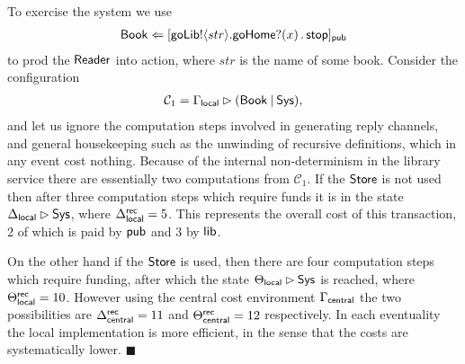\documentclass{LMCS}
\newcommand{\pfn}[1]{\mathsf{#1}}  \newcommand{\cfn}[1]{\mathsf{#1}}  \newcommand{\ownfnt}[1]{{\mathsf{#1}}}
\newcommand{\with}{\mathbin \rhd}
\newcommand{\record}{{\scriptstyle \mathsf{rec}}}
\newcommand{\calC}{\mathcal{C}}
\newcommand{\pa}[1]{\!\left(#1\right)}
\newcommand{\pc}[1]{\langle#1\rangle}
\newcommand{\Cstop}{\mathop{\pfn{stop}}}
\newcommand{\Cpar}{\mathbin{|}}
\newcommand{\Cloc}[2]{[#1]_{\ownfnt{#2}}}
\newcommand{\EndDefBox}{\null\hfill$\blacksquare$}
\newcommand{\boxHere}{\global\let\EndProof\empty\EndDefBox}
\begin{document}
\begin{exa}
To exercise the system we use
\begin{align*}
  \GB \Leftarrow \Cloc{\goLib!\pc{str}. \goHome?\pa{x}. \Cstop}{\Cpublic}
\end{align*}
to prod the $\Reader$ into action, 
where $str$ is the name of some book. 
Consider the configuration 
\begin{align*}
  \calC_1 = \Gamma_{\local} \with (\GB \Cpar \Sys),
\end{align*}
and let us ignore the computation steps involved in generating reply
channels, and general housekeeping such as the unwinding of recursive
definitions, which in any event cost nothing.  Because of the internal
non-determinism in the library service there are essentially two
computations from $\calC_1$. If the $\Store$ is not used then after
three computation steps which require funds it is in the state $ \Delta_{\local} \with
\Sys $, where $\Delta_{\local}^{\record} = 5$. This represents the overall cost of
this transaction, $2$ of which is paid by $\Cpublic$ and $3$ by $\Clib$. 

On the other hand if the $\Store$   is used, then there are 
four computation steps which require funding, after which the state 
$\Theta_{\local}
\with \Sys$ is reached, where $\Theta_{\local}^{\record} = 10$.  However using
the central cost environment $\Gamma_{\central}$ the two possibilities
are $\Delta_{\central}^{\record} = 11$ and
$\Theta_{\central}^{\record} = 12$ respectively.  In each eventuality
the local implementation is more efficient, in the sense that the costs are systematically
lower. 
\boxHere
\end{exa}
\end{document}
